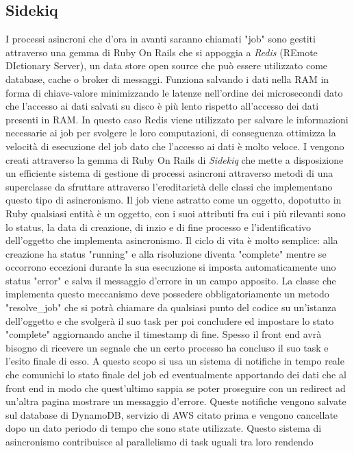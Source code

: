 \documentclass[target=bach,aauheader=,style=]{thud}
\begin{document}
\subsection{Sidekiq}

I processi asincroni che d'ora in avanti saranno chiamati "job" sono gestiti attraverso una gemma di Ruby On Rails che si appoggia a \textit{Redis}\cite{redis_home} (REmote DIctionary Server), un
data store open source che può essere utilizzato come database, cache o broker di messaggi. Funziona salvando i dati nella RAM in forma di chiave-valore minimizzando le latenze nell'ordine dei microsecondi
dato che l'accesso ai dati salvati su disco è più lento rispetto all'accesso dei dati presenti in RAM. In questo caso Redis viene utilizzato per salvare le informazioni necessarie ai
job per svolgere le loro computazioni, di conseguenza ottimizza la velocità di esecuzione del job dato che l'accesso ai dati è molto veloce.
I vengono creati attraverso la gemma di Ruby On Rails di \textit{Sidekiq}\cite{sidekiq} che mette a disposizione un efficiente sistema di gestione di processi asincroni attraverso
metodi di una superclasse da sfruttare attraverso l'ereditarietà delle classi che implementano questo tipo di asincronismo. Il job viene astratto come un oggetto, dopotutto in
Ruby qualsiasi entità è un oggetto, con i suoi attributi fra cui i più rilevanti sono lo status, la data di creazione, di inzio e di fine processo e l'identificativo dell'oggetto che
implementa asincronismo. Il ciclo di vita è molto semplice: alla creazione ha status "running" e alla risoluzione diventa "complete" mentre se occorrono eccezioni durante la sua esecuzione
si imposta automaticamente uno status "error" e salva il messaggio d'errore in un campo apposito. La classe che implementa questo meccanismo deve possedere obbligatoriamente un metodo
"resolve\_job" che si potrà chiamare da qualsiasi punto del codice su un'istanza dell'oggetto e che svolgerà il suo task per poi concludere ed impostare lo stato "complete" aggiornando
anche il timestamp di fine. Spesso il front end avrà bisogno di ricevere un segnale che un certo processo ha concluso il suo task e l'esito finale di esso.
A questo scopo si usa un sistema di notifiche in tempo reale che comunichi lo stato finale del job ed eventualmente apportando dei dati che al front end in modo che quest'ultimo sappia
se poter proseguire con un redirect ad un'altra pagina mostrare un messaggio d'errore. Queste notifiche vengono salvate sul database di DynamoDB, servizio di AWS citato
prima e vengono cancellate dopo un dato periodo di tempo che sono state utilizzate. Questo sistema di asincronismo contribuisce al parallelismo di task uguali tra loro rendendo
\end{document}
